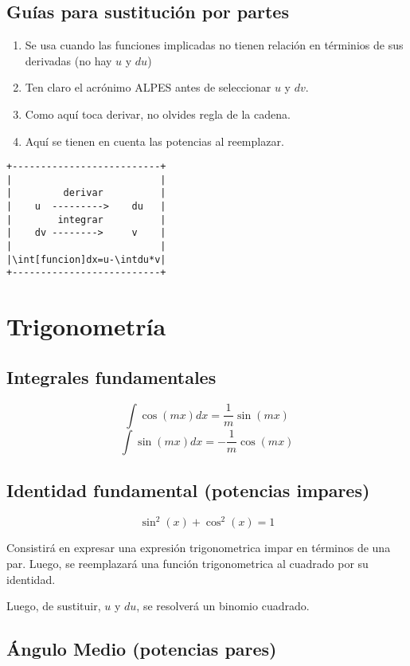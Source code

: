\documentclass[11pt]{article}
\begin{document}
\subsection{Guías para sustitución por partes}
\label{sec-2-2}
\begin{enumerate}
\item Se usa cuando las funciones implicadas no tienen relación en términios de sus derivadas (no hay \(u\) y \(du\))
\item Ten claro el acrónimo ALPES antes de seleccionar \(u\) y \(dv\).
\item Como aquí toca derivar, no olvides regla de la cadena.
\item Aquí se tienen en cuenta las potencias al reemplazar.
\end{enumerate}


\begin{verbatim}
+--------------------------+
|                          |
|         derivar          |
|    u  --------->    du   |
|        integrar          |
|    dv -------->     v    |
|                          |
|\int[funcion]dx=u-\intdu*v|   
+--------------------------+
\end{verbatim}
\section{Trigonometría}
\label{sec-3}
\subsection{Integrales fundamentales}
\label{sec-3-1}
\[\int \cos(mx)dx =  \frac{1}{m} \sin(mx)\]
\[\int \sin(mx)dx = - \frac{1}{m} \cos(mx)\]
\subsection{Identidad fundamental (potencias impares)}
\label{sec-3-2}
\[\sin^2(x) + \cos^2(x) = 1\]

Consistirá en expresar una expresión trigonometrica impar en términos de una par.
Luego, se reemplazará una función trigonometrica al cuadrado por su identidad.

Luego, de sustituir, \(u\) y \(du\), se resolverá un binomio cuadrado.







\subsection{Ángulo Medio (potencias pares)}
\label{sec-3-3}
\end{document}
